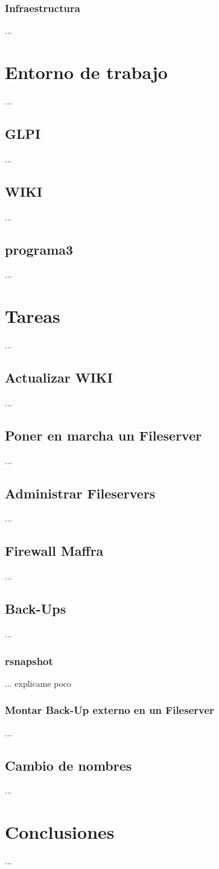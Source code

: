 \documentclass[12pt,a4paper]{article}
\begin{document}
\subsubsection{Infraestructura}
...

\section{Entorno de trabajo}
...

\subsection{GLPI}
...

\subsection{WIKI}
...

\subsection{programa3}
...

\section{Tareas}
...

\subsection{Actualizar WIKI}
...

\subsection{Poner en marcha un Fileserver}
...

\subsection{Administrar Fileservers}
...

\subsection{Firewall Maffra}
...

\subsection{Back-Ups}
...

\subsubsection{rsnapshot}
... explicame poco

\subsubsection{Montar Back-Up externo en un Fileserver}
...

\subsection{Cambio de nombres}
...

\section{Conclusiones}
...
\end{document}
